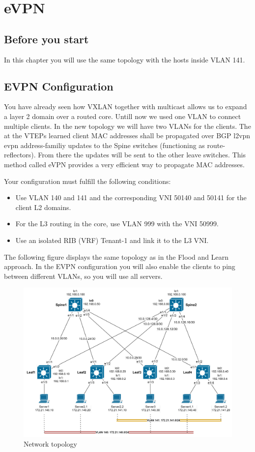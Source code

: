 \documentclass[11pt,titlepage]{article}
\newenvironment{shadedquotation}
 {\begin{shaded*}
  \quoting[leftmargin=0pt, vskip=0pt]
 }
 {\endquoting
 \end{shaded*}
}
\begin{document}
\section{eVPN}
\subsection{Before you start}
In this chapter you will use the same topology with the hosts inside VLAN 141.
\subsection{EVPN Configuration}
You have already seen how VXLAN together with multicast allows us to expand a layer 2 domain over a routed core. Untill now we used one VLAN to connect multiple clients. In the new topology we will have two VLANs for the clients. The at the VTEPs learned client MAC addresses shall be propagated over BGP l2vpn evpn address-familiy updates to the Spine switches (functioning as route-reflectors). From there the updates will be sent to the other leave switches. This method called eVPN provides a very efficient way to propagate MAC addresses.
\begin{shadedquotation}
	Your configuration must fulfill the following conditions:
	\begin{itemize}
		\item Use VLAN 140 and 141 and the corresponding VNI 50140 and 50141 for the client L2
		domains.
		\item For the L3 routing in the core, use VLAN 999 with the VNI 50999.
		\item Use an isolated RIB (VRF) Tenant-1 and link it to the L3 VNI.
	\end{itemize}
\end{shadedquotation}
The following figure displays the same topology as in the Flood and Learn approach. In the EVPN configuration you will also enable the clients to ping between different VLANs, so you will use all servers.
\begin{figure}[H]
	\centering
	\includegraphics[width=0.9\linewidth]{images/topology}
	\caption{Network topology}
	\label{fig:topology-evpn}
\end{figure}
\end{document}
